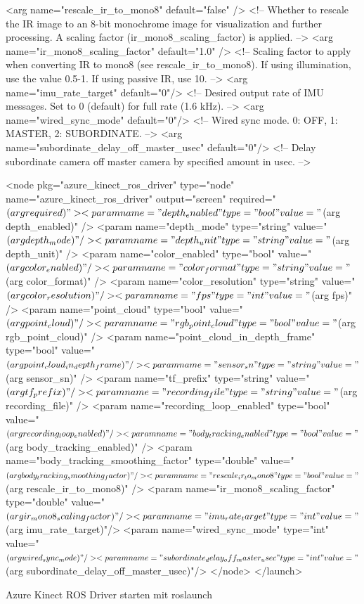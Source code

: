 \begin{roslaunch}[breaklines=true,label=lst:driverlaunch,caption={Azure ROS Driver Start}]
      <arg name="rescale_ir_to_mono8"  default="false" />    <!-- Whether to rescale the IR image to an 8-bit monochrome image for visualization and further processing. A scaling factor (ir_mono8_scaling_factor) is applied. -->
      <arg name="ir_mono8_scaling_factor"  default="1.0" />    <!-- Scaling factor to apply when converting IR to mono8 (see rescale_ir_to_mono8). If using illumination, use the value 0.5-1. If using passive IR, use 10. -->
      <arg name="imu_rate_target" default="0"/>                       <!-- Desired output rate of IMU messages. Set to 0 (default) for full rate (1.6 kHz). --> 
      <arg name="wired_sync_mode" default="0"/>                       <!-- Wired sync mode. 0: OFF, 1: MASTER, 2: SUBORDINATE. --> 
      <arg name="subordinate_delay_off_master_usec" default="0"/>     <!-- Delay subordinate camera off master camera by specified amount in usec. --> 
    
      <node pkg="azure_kinect_ros_driver" type="node" name="azure_kinect_ros_driver" output="screen" required="$(arg required)">
        <param name="depth_enabled"     type="bool"   value="$(arg depth_enabled)" />
        <param name="depth_mode"        type="string" value="$(arg depth_mode)" />
        <param name="depth_unit"        type="string" value="$(arg depth_unit)" />
        <param name="color_enabled"     type="bool"   value="$(arg color_enabled)" />
        <param name="color_format"      type="string" value="$(arg color_format)" />
        <param name="color_resolution"  type="string" value="$(arg color_resolution)" />
        <param name="fps"               type="int"    value="$(arg fps)" />
        <param name="point_cloud"       type="bool"   value="$(arg point_cloud)" />
        <param name="rgb_point_cloud"   type="bool"   value="$(arg rgb_point_cloud)" />
        <param name="point_cloud_in_depth_frame"   type="bool"   value="$(arg point_cloud_in_depth_frame)" />
        <param name="sensor_sn"         type="string" value="$(arg sensor_sn)" />
        <param name="tf_prefix"         type="string" value="$(arg tf_prefix)" />
        <param name="recording_file"          type="string" value="$(arg recording_file)" />
        <param name="recording_loop_enabled"  type="bool"   value="$(arg recording_loop_enabled)" />
        <param name="body_tracking_enabled"           type="bool"   value="$(arg body_tracking_enabled)" />
        <param name="body_tracking_smoothing_factor"  type="double" value="$(arg body_tracking_smoothing_factor)" />
        <param name="rescale_ir_to_mono8" type="bool" value="$(arg rescale_ir_to_mono8)" />
        <param name="ir_mono8_scaling_factor" type="double" value="$(arg ir_mono8_scaling_factor)" />
        <param name="imu_rate_target" type="int" value="$(arg imu_rate_target)"/>
        <param name="wired_sync_mode" type="int" value="$(arg wired_sync_mode)"/>
        <param name="subordinate_delay_off_master_usec" type="int" value="$(arg subordinate_delay_off_master_usec)"/>
      </node>
</launch>
\end{roslaunch}
\lstlistingname{ Azure Kinect ROS Driver starten mit roslaunch}

